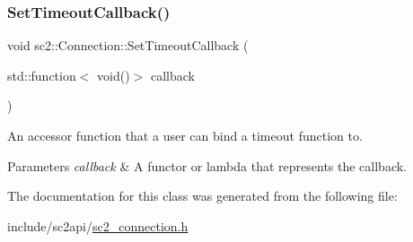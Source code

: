 \subsubsection{\texorpdfstring{Set\+Timeout\+Callback()}{SetTimeoutCallback()}}
{\footnotesize\ttfamily void sc2\+::\+Connection\+::\+Set\+Timeout\+Callback (\begin{DoxyParamCaption}\item[{std\+::function$<$ void()$>$}]{callback }\end{DoxyParamCaption})}

An accessor function that a user can bind a timeout function to. 
\begin{DoxyParams}{Parameters}
{\em callback} & A functor or lambda that represents the callback. \\
\hline
\end{DoxyParams}


The documentation for this class was generated from the following file\+:\begin{DoxyCompactItemize}
\item 
include/sc2api/\hyperlink{sc2__connection_8h}{sc2\+\_\+connection.\+h}\end{DoxyCompactItemize}
